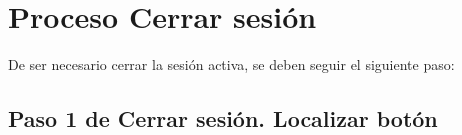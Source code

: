\chapter{Proceso Cerrar sesión}
	De ser necesario cerrar la sesión activa, se deben seguir el
	siguiente paso: 
\section{Paso 1 de Cerrar sesión. Localizar botón}
	
